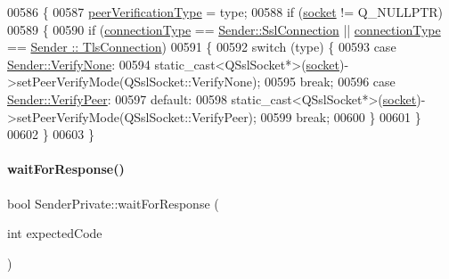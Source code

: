 \begin{DoxyCode}
00586 \{
00587     \hyperlink{class_simple_mail_1_1_sender_private_ab6854bd0a124acdc3e21aef40e59c41a}{peerVerificationType} = type;
00588     \textcolor{keywordflow}{if} (\hyperlink{class_simple_mail_1_1_sender_private_a223cab47555a39f45f30569328fa20bc}{socket} != Q\_NULLPTR)
00589     \{
00590         \textcolor{keywordflow}{if} (\hyperlink{class_simple_mail_1_1_sender_private_a2d09eb5d137213e97f10228f8ed68134}{connectionType} == \hyperlink{class_simple_mail_1_1_sender_a89e6a9572b306441237f6b6635729d1aadd47ac04a99ebb279aaa4cf5cdfa78f5}{Sender::SslConnection} || 
      \hyperlink{class_simple_mail_1_1_sender_private_a2d09eb5d137213e97f10228f8ed68134}{connectionType} == \hyperlink{class_simple_mail_1_1_sender_a89e6a9572b306441237f6b6635729d1aa3461f2931e043fc3ea86a0015c735159}{Sender :: TlsConnection})
00591         \{
00592             \textcolor{keywordflow}{switch} (type) \{
00593                 \textcolor{keywordflow}{case} \hyperlink{class_simple_mail_1_1_sender_acfbcf388ab7c26cd41c5c77601fe8804a22f77592aa7f05238f2d1f25a13169c1}{Sender::VerifyNone}:
00594                     \textcolor{keyword}{static\_cast<}QSslSocket*\textcolor{keyword}{>}(\hyperlink{class_simple_mail_1_1_sender_private_a223cab47555a39f45f30569328fa20bc}{socket})->setPeerVerifyMode(QSslSocket::VerifyNone);
00595                     \textcolor{keywordflow}{break};
00596                 \textcolor{keywordflow}{case} \hyperlink{class_simple_mail_1_1_sender_acfbcf388ab7c26cd41c5c77601fe8804ac24a70d89382bb95b91501222056c389}{Sender::VerifyPeer}:
00597                 \textcolor{keywordflow}{default}:
00598                     \textcolor{keyword}{static\_cast<}QSslSocket*\textcolor{keyword}{>}(\hyperlink{class_simple_mail_1_1_sender_private_a223cab47555a39f45f30569328fa20bc}{socket})->setPeerVerifyMode(QSslSocket::VerifyPeer);
00599                     \textcolor{keywordflow}{break};
00600             \}
00601         \}
00602     \}
00603 \}
\end{DoxyCode}
\mbox{\label{class_simple_mail_1_1_sender_private_af8ba23dc3e1201d303ad1d923235c71c}} 
\paragraph{\texorpdfstring{wait\+For\+Response()}{waitForResponse()}}
{\footnotesize\ttfamily bool Sender\+Private\+::wait\+For\+Response (\begin{DoxyParamCaption}\item[{int}]{expected\+Code }\end{DoxyParamCaption})}



